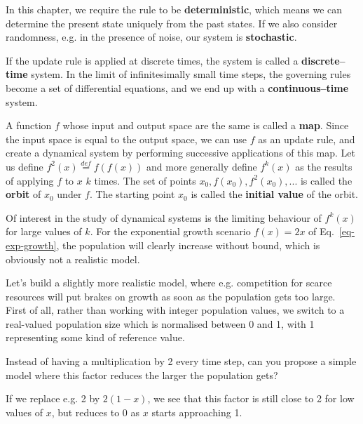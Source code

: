 In this chapter, we require the rule to be \textbf{deterministic}, which means we can determine the present state uniquely from the past states. If we also consider randomness, e.g. in the presence of noise, our system is \textbf{stochastic}.

If the update rule is applied at discrete times, the system is called a \textbf{discrete--time} system. In the limit of infinitesimally small time steps, the governing rules become a set of differential equations, and we end up with a \textbf{continuous--time} system.

\pagebreak


A function $f$ whose input and output space are the same is called a \textbf{map}. Since the input space is equal to the output space, we can use $f$ as an update rule, and create a dynamical system by performing successive applications of this map. Let us define $f^2(x) \stackrel{def}{=} f(f(x))$ and more generally define $f^k(x)$ as the results of applying $f$ to $x$ $k$ times. \noindent{} The set of points ${x_0, f(x_0), f^2(x_0), ...}$ is called the \textbf{orbit} of $x_0$ under $f$. The starting point $x_0$ is called the \textbf{initial value} of the orbit.

Of interest in the study of dynamical systems is the limiting behaviour of $f^k(x)$ for large values of $k$. For the exponential growth scenario $f(x)=2x$ of Eq.~\ref{eq-exp-growth}, the population will clearly increase without bound, which is obviously not a realistic model.

Let's build a slightly more realistic model, where e.g. competition for scarce resources will put brakes on growth as soon as the population gets too large. First of all, rather than working with integer population values, we switch to a real-valued population size which is normalised between 0 and 1, with 1 representing some kind of reference value. 

\begin{cue}
Instead of having a multiplication by 2 every time step, can you propose a simple model where this factor reduces the larger the population gets? 
\end{cue}

If we replace e.g. 2 by $2(1-x)$, we see that this factor is still close to 2 for low values of $x$, but reduces to 0 as $x$ starts approaching 1.

